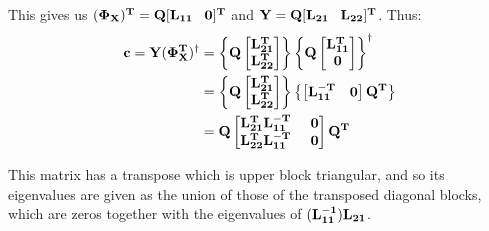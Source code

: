 \documentclass{article}
\begin{document}
This gives us $\bf (\Phi_X)^T = Q [ L_{11} \;\;\; 0 ]^T $ and $\bf Y = Q [ L_{21} \;\;\; L_{22} ]^T  $. Thus:
\begin{equation}
\begin{aligned}
\bf c = Y (\Phi_{X}^T)^{\dagger} &= \left \lbrace \bf Q
\begin{bmatrix}
\bf L_{21}^T \\
\bf L_{22}^T
\end{bmatrix} \right \rbrace
\left \lbrace \bf Q
\begin{bmatrix}
\bf L_{11}^T \\
\bf 0
\end{bmatrix} \right \rbrace ^{\dagger} \\
& = 
\left \lbrace \bf Q
\begin{bmatrix}
\bf L_{21}^T \\
\bf L_{22}^T
\end{bmatrix} \right \rbrace
\left \lbrace
\begin{bmatrix}
\bf L_{11}^{-T} & \bf 0
\end{bmatrix} \bf Q^T
\right \rbrace \\
& = 
\bf Q 
\begin{bmatrix}
\bf L_{21}^T L_{11}^{-T} \;\;\;\;\; 0 \\
\bf L_{22}^T L_{11}^{-T} \;\;\;\;\; 0
\end{bmatrix} \bf Q^T
\end{aligned}
\end{equation}

This matrix has a transpose which is upper block triangular, and so its eigenvalues 
are given as the union of those of the transposed diagonal blocks, which are zeros together with 
the eigenvalues of $\bf (L_{11}^{-1}) L_{21} $.
\end{document}
